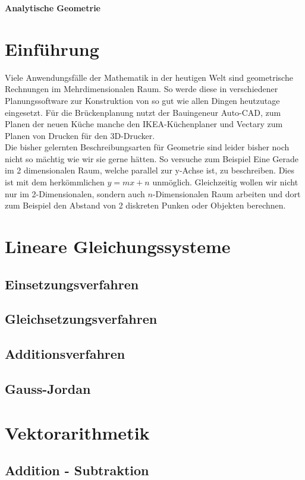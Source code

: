\documentclass[a4paper,12pt]{article}
\newcommand{\Uebungsblatt}{Analytische Geometrie}
\begin{document}
	\thispagestyle{fancy}
	\begin{center}
		\LARGE \sf \textbf{ \Uebungsblatt{}}
	\end{center}
	
	\vspace*{0.1cm}
	\section{Einführung}
	Viele Anwendungsfälle der Mathematik in der heutigen Welt sind geometrische Rechnungen im Mehrdimensionalen Raum. So werde diese in verschiedener Planungssoftware zur Konstruktion von so gut wie allen Dingen heutzutage eingesetzt. Für die Brückenplanung nutzt der Bauingeneur Auto-CAD, zum Planen der neuen Küche manche den IKEA-Küchenplaner und Vectary zum Planen von Drucken für den 3D-Drucker.\\
	Die bisher gelernten Beschreibungsarten für Geometrie sind leider bisher noch nicht so mächtig wie wir sie gerne hätten. So versuche zum Beispiel Eine Gerade im 2 dimensionalen Raum, welche parallel zur y-Achse ist, zu beschreiben. Dies ist mit dem herkömmlichen $y=mx+n$ unmöglich. Gleichzeitig wollen wir nicht nur im 2-Dimensionalen, sondern auch $n$-Dimensionalen Raum arbeiten und dort zum Beispiel den Abstand von 2 diskreten Punken oder Objekten berechnen.\\ 
	\section{Lineare Gleichungssysteme}
	\subsection{Einsetzungsverfahren}
	\subsection{Gleichsetzungsverfahren}
	\subsection{Additionsverfahren}
	\subsection{Gauss-Jordan}
	\section{Vektorarithmetik}
	\subsection{Addition - Subtraktion}
\end{document}
